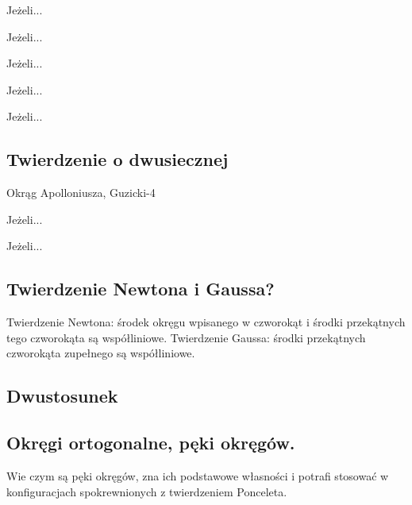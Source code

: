 \begin{definition}
	Jeżeli...
\end{definition}
\begin{proposition}
	Jeżeli...
\end{proposition}
\begin{definition}[oś potęgowa]
	Jeżeli...
\end{definition}
\begin{theorem}[Monge'a]
	Jeżeli...
\end{theorem}
\begin{theorem}[Auberta]
	Jeżeli...
\end{theorem}


\subsection{Twierdzenie o dwusiecznej}
Okrąg Apolloniusza, Guzicki-4

\begin{proposition}
	Jeżeli...
\end{proposition}




\begin{definition}
	Jeżeli...
\end{definition}


\subsection{Twierdzenie Newtona i Gaussa?}
Twierdzenie Newtona: środek okręgu wpisanego w czworokąt i środki przekątnych tego czworokąta są współliniowe.
Twierdzenie Gaussa: środki przekątnych czworokąta zupełnego są współliniowe.

\subsection{Dwustosunek}

\subsection{Okręgi ortogonalne, pęki okręgów.}
Wie czym są pęki okręgów, zna ich podstawowe własności i potrafi stosować w konfiguracjach spokrewnionych z twierdzeniem Ponceleta.   

